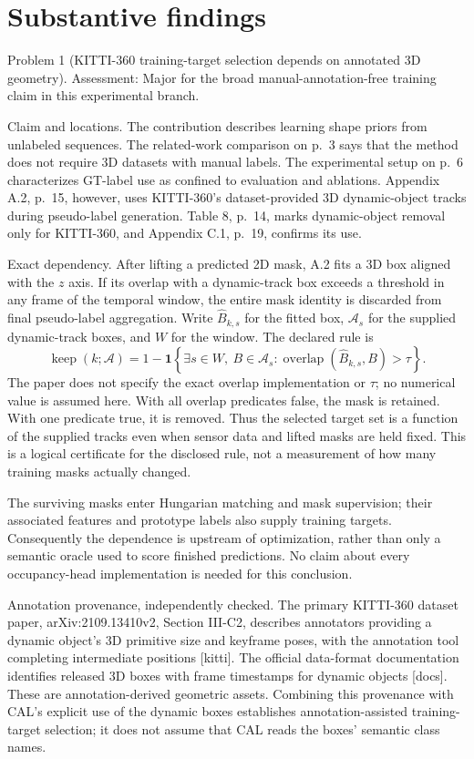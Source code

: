 \documentclass[10pt]{article}
\begin{document}
\section*{Substantive findings}
Problem 1 (KITTI-360 training-target selection depends on annotated 3D geometry).  Assessment: Major for the broad manual-annotation-free training claim in this experimental branch.\par
Claim and locations. The contribution describes learning shape priors from unlabeled sequences. The related-work comparison on p. 3 says that the method does not require 3D datasets with manual labels. The experimental setup on p. 6 characterizes GT-label use as confined to evaluation and ablations. Appendix A.2, p. 15, however, uses KITTI-360’s dataset-provided 3D dynamic-object tracks during pseudo-label generation. Table 8, p. 14, marks dynamic-object removal only for KITTI-360, and Appendix C.1, p. 19, confirms its use.\par
Exact dependency. After lifting a predicted 2D mask, A.2 fits a 3D box aligned with the \(z\) axis. If its overlap with a dynamic-track box exceeds a threshold in any frame of the temporal window, the entire mask identity is discarded from final pseudo-label aggregation. Write \(\widehat B_{k,s}\) for the fitted box, \(\mathcal A_s\) for the supplied dynamic-track boxes, and \(W\) for the window. The declared rule is \[\operatorname{keep}(k;\mathcal A)
 =1-\mathbf 1\!\left\{
 \exists s\in W,\ B\in\mathcal A_s:
 \operatorname{overlap}(\widehat B_{k,s},B)>\tau
 \right\}.\] The paper does not specify the exact overlap implementation or \(\tau\); no numerical value is assumed here. With all overlap predicates false, the mask is retained. With one predicate true, it is removed. Thus the selected target set is a function of the supplied tracks even when sensor data and lifted masks are held fixed. This is a logical certificate for the disclosed rule, not a measurement of how many training masks actually changed.\par
The surviving masks enter Hungarian matching and mask supervision; their associated features and prototype labels also supply training targets. Consequently the dependence is upstream of optimization, rather than only a semantic oracle used to score finished predictions. No claim about every occupancy-head implementation is needed for this conclusion.\par
Annotation provenance, independently checked. The primary KITTI-360 dataset paper, arXiv:2109.13410v2, Section III-C2, describes annotators providing a dynamic object’s 3D primitive size and keyframe poses, with the annotation tool completing intermediate positions [kitti]. The official data-format documentation identifies released 3D boxes with frame timestamps for dynamic objects [docs]. These are annotation-derived geometric assets. Combining this provenance with CAL’s explicit use of the dynamic boxes establishes annotation-assisted training-target selection; it does not assume that CAL reads the boxes’ semantic class names.\par
\end{document}
